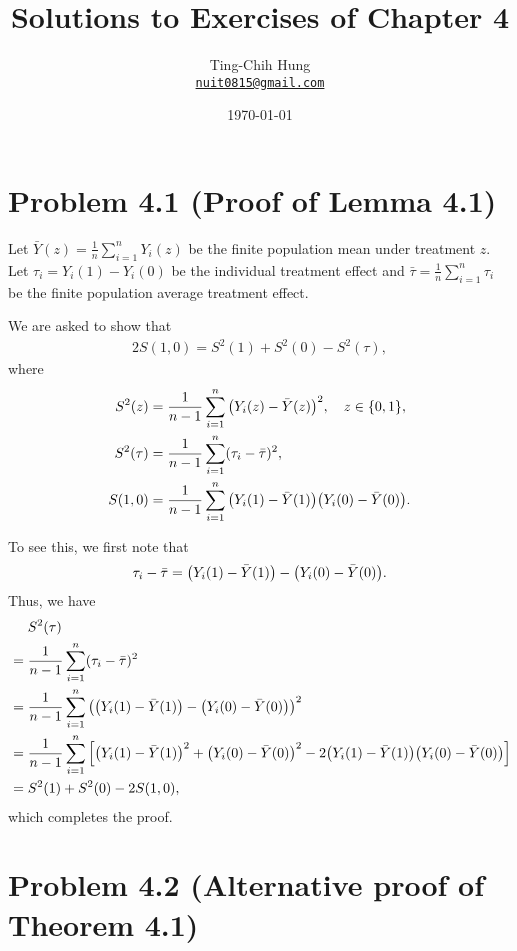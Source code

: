 \documentclass[10pt]{article}
\title{Solutions to Exercises of Chapter 4}
\author{Ting-Chih Hung \\ \href{mailto:nuit0815@gmail.com}{\texttt{nuit0815@gmail.com}}}
\date{\today}
\begin{document}
\maketitle


\section*{Problem 4.1 (Proof of Lemma 4.1)}

Let $\bar{Y}(z) = \frac{1}{n} \sum_{i=1}^n Y_i(z)$ be the finite population mean
under treatment $z$.
Let $\tau_i = Y_i(1) - Y_i(0)$ be the individual treatment effect
and $\bar{\tau} = \frac{1}{n} \sum_{i=1}^n \tau_i$ be 
the finite population average treatment effect.

We are asked to show that
\begin{align*}
  2S(1, 0) = S^2(1) + S^2(0) - S^2(\tau),
\end{align*}
where
\begin{align*}
  S^2(z) &= \frac{1}{n - 1} \sum_{i=1}^n {\left( Y_i(z) - \bar{Y}(z) \right)}^2, \quad z \in {\left\lbrace 0, 1 \right\rbrace}, \\
  S^2(\tau) &= \frac{1}{n - 1} \sum_{i=1}^n (\tau_i - \bar{\tau})^2, \\
  S(1, 0) &= \frac{1}{n - 1} \sum_{i=1}^n {\left( Y_i(1) - \bar{Y}(1) \right)} {\left( Y_i(0) - \bar{Y}(0) \right)}.
\end{align*}

To see this, we first note that
\begin{align*}
  \tau_i - \bar{\tau}
  = {\left( Y_i(1) - \bar{Y}(1) \right)} - {\left( Y_i(0) - \bar{Y}(0) \right)}.
\end{align*}
Thus, we have
\begin{align*}
  &\mathrel{\phantom{=}}S^2(\tau) \\
  &= \frac{1}{n - 1} \sum_{i=1}^n (\tau_i - \bar{\tau})^2 \\
  &= \frac{1}{n - 1} \sum_{i=1}^n {\left( {\left( Y_i(1) - \bar{Y}(1) \right)} - {\left( Y_i(0) - \bar{Y}(0) \right)} \right)}^2 \\
  &= \frac{1}{n - 1} \sum_{i=1}^n {\left[ 
    {\left( Y_i(1) - \bar{Y}(1) \right)}^2
    + {\left( Y_i(0) - \bar{Y}(0) \right)}^2
    - 2{\left( Y_i(1) - \bar{Y}(1) \right)}{\left( Y_i(0) - \bar{Y}(0) \right)}
   \right]} \\
  &= S^2(1) + S^2(0) - 2S(1, 0),
\end{align*}
which completes the proof.

\section*{Problem 4.2 (Alternative proof of Theorem 4.1)}
\end{document}
